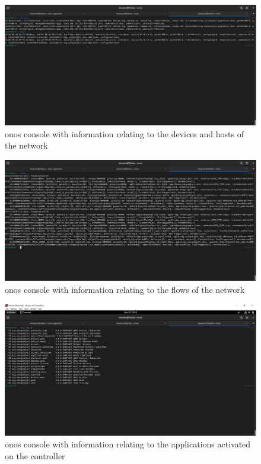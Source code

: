 \begin{figure}
	\centering
	\includegraphics[width=\textwidth]{Chapters/Figures/tests/bmv2_phase_1/onos_topology.PNG}
	\caption{\gls{onos} console with information relating to the devices and hosts of the network}
	\label{fig:exp2_phase1_onos}
\end{figure}

\begin{figure}
	\centering
	\includegraphics[width=\textwidth]{Chapters/Figures/tests/bmv2_phase_1/flows.PNG}
	\caption{\gls{onos} console with information relating to the flows of the network}
	\label{fig:exp2_phase1_onos_flows}
\end{figure}

\begin{figure}
	\centering
	\includegraphics[width=\textwidth]{Chapters/Figures/tests/bmv2_phase_1/onos_apps.PNG}
	\caption{\gls{onos} console with information relating to the applications activated on the controller}
	\label{fig:exp2_phase1_onos_apps}
\end{figure}

